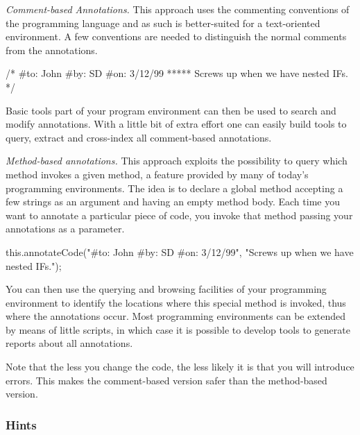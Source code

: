 \documentclass[a4paper,10pt,twoside]{book}
\begin{document}
\begin{bulletlist}
\item \emph{Comment-based Annotations.}
This approach uses the commenting conventions of the programming language and as such is better-suited for a text-oriented environment. A few conventions are needed to distinguish the normal comments from the annotations.
\begin{code}
/*  #to: John #by: SD #on: 3/12/99 *****
    Screws up when we have nested IFs. */
\end{code}
Basic tools part of your program environment can then be used to search and modify annotations. With a little bit of extra effort one can easily build tools to query, extract and cross-index all comment-based annotations.

\item \emph{Method-based annotations.}
This approach exploits the possibility to query which method invokes a given method, a feature provided by many of today's programming environments. The idea is to declare a global method accepting a few strings as an argument and having an empty method body. Each time you want to annotate a particular piece of code, you invoke that method passing your annotations as a parameter.
\begin{code}
this.annotateCode("#to: John #by: SD #on: 3/12/99",
    "Screws up when we have nested IFs.");
\end{code}
You can then use the querying and browsing facilities of your programming environment to identify the locations where this special method is invoked, thus where the annotations occur. Most programming environments can be extended by means of little scripts, in which case it is possible to develop tools to generate reports about all annotations.

Note that the less you change the code, the less likely it is that you will introduce errors. This makes the comment-based version safer than the method-based version.
\end{bulletlist}

\subsubsection*{Hints}
\end{document}
